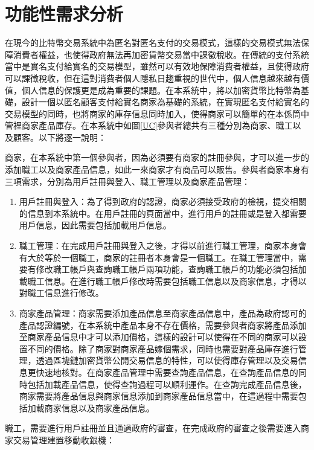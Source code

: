 \section{功能性需求分析}

在現今的比特幣交易系統中為匿名對匿名支付的交易模式，這樣的交易模式無法保障消費者權益，也使得政府無法再加密貨幣交易當中課徵稅收。在傳統的支付系統當中是實名支付給實名的交易模型，雖然可以有效地保障消費者權益，且使得政府可以課徵稅收，但在這對消費者個人隱私日趨重視的世代中，個人信息越來越有價值，個人信息的保護更是成為重要的課題。在本系統中，將以加密貨幣比特幣為基礎，設計一個以匿名顧客支付給實名商家為基礎的系統，在實現匿名支付給實名的交易模型的同時，也將商家的庫存信息同時加入，使得商家可以簡單的在本係筒中管裡商家產品庫存。在本系統中如圖\ref{UC}參與者總共有三種分別為商家、職工以及顧客。以下將逐一說明：

商家，在本系統中第一個參與者，因為必須要有商家的註冊參與，才可以進一步的添加職工以及商家產品信息，如此一來商家才有商品可以販售。參與者商家本身有三項需求，分別為用戶註冊與登入、職工管理以及商家產品管理：

	\begin{enumerate}
	\item 用戶註冊與登入：為了得到政府的認證，商家必須接受政府的檢視，提交相關的信息到本系統中。在用戶註冊的頁面當中，進行用戶的註冊或是登入都需要用戶信息，因此需要包括加載用戶信息。
	\item 職工管理：在完成用戶註冊與登入之後，才得以前進行職工管理，商家本身會有大於等於一個職工，商家的註冊者本身會是一個職工。在職工管理當中，需要有修改職工帳戶與查詢職工帳戶兩項功能，查詢職工帳戶的功能必須包括加載職工信息。在進行職工帳戶修改時需要包括職工信息以及商家信息，才得以對職工信息進行修改。
	\item 商家產品管理：商家需要添加產品信息至商家產品信息中，產品為政府認可的產品認證編號，在本系統中產品本身不存在價格，需要參與者商家將產品添加至商家產品信息中才可以添加價格，這樣的設計可以使得在不同的商家可以設置不同的價格。除了商家對商家產品嫁個需求，同時也需要對產品庫存進行管理，透過區塊鏈加密貨幣公開交易信息的特性，可以使得庫存管理以及交易信息更快速地核對。在商家產品管理中需要查詢產品信息，在查詢產品信息的同時包括加載產品信息，使得查詢過程可以順利運作。在查詢完成產品信息後，商家需要將產品信息與商家信息添加到商家產品信息當中，在這過程中需要包括加載商家信息以及商家產品信息。

	\end{enumerate}

職工，需要進行用戶註冊並且通過政府的審查，在完成政府的審查之後需要進入商家交易管理建置移動收銀機：

